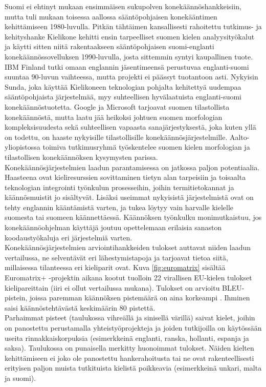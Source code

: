 \begin{multicols}{2}
Suomi ei ehtinyt mukaan ensimmäisen sukupolven konekäännöshankkeisiin,
mutta tuli mukaan toisessa aallossa sääntöpohjaisen konekääntimen
kehittämiseen 1980-luvulla. Pitkän tähtäimen kansallisesti rahoitettu
tutkimus- ja kehityshanke Kielikone kehitti ensin tarpeelliset suomen
kielen analyysityökalut ja käytti sitten niitä rakentaakseen
sääntöpohjaisen suomi-englanti konekäännössovelluksen 1990-luvulla,
josta sittemmin syntyi kaupallinen tuote. IBM Finland tutki omaan
englannin jäsentimeensä perustuvaa englanti-suomi suuntaa 90-luvun
vaihteessa, mutta projekti ei päässyt tuotantoon asti. Nykyisin Sunda,
joka käyttää Kielikoneen teknologian pohjalta kehitettyä uudempaa
sääntöpohjaista järjestelmää, myy suhteellisen hyvälaatuista
englanti-suomi konekäännöstuotetta. Google ja Microsoft tarjoavat
suomen tilastollista konekäännöstä, mutta laatu jää heikoksi johtuen
suomen morfologian kompleksisuudesta sekä suhteellisen vapaasta
sanajärjestyksestä, joka kuten yllä on todettu, on haaste nykyisille
tilastollisille konekäännösjärjestelmille. Aalto-yliopistossa toimiva
tutkimusryhmä työskentelee suomen kielen morfologian ja tilastollisen
konekäännöksen kysymysten parissa.\\
Konekäännösjärjestelmien laadun parantamisessa on jatkossa paljon
potentiaalia. Haasteena ovat kieliresurssien sovittaminen tietyn alan
tarpeisiin ja toisaalta teknologian integrointi työnkulun prosesseihin, joihin 
termitietokannat ja käännösmuistit jo sisältyvät. Lisäksi useimmat nykyisistä 
järjestelmistä ovat on tehty englannin kääntämistä varten, ja tukea
löytyy vain harvalle kielelle suomesta tai suomeen käännettäessä. Käännöksen 
työnkulku monimutkaistuu, jos konekäännöohjelman käyttäjä joutuu opettelemaan 
erilaisia sanaston koodaustyökaluja eri järjestelmiä varten.\\
Konekäännösjärjestelmien arviointihankkeiden tulokset auttavat niiden
laadun vertailussa, ne selventävät eri lähestymistapoja ja tarjoavat
tietoa siitä, millaisessa tilanteessa eri kieliparit ovat. Kuva
\ref{fig:euromatrix} sisältää Euromatrix+ -projektin aikana kootut
tuolloin 22 virallisen EU-kielen tulokset kielipareittain (iiri ei
ollut vertailussa mukana). Tulokset on arvioitu BLEU-pistein, joissa
paremman käännöksen pistemäärä on aina korkeampi \cite{BLEU}. Ihminen
saisi käännöstehtävästä keskimäärin 80 pistettä.\\
Parhaimmat pisteet (taulukossa vihreällä ja sinisellä värillä) saivat
kielet, joihin on panostettu perustamalla yhteistyöprojekteja ja
joiden tutkijoilla on käytössään useita rinnakkaiskorpuksia
(esimerkkeinä englanti, ranska, hollanti, espanja ja
saksa). Taulukossa on punaisella merkitty huonoimmat tulokset.  Näiden
kielten kehittämiseen ei joko ole panostettu hankerahoitusta tai ne
ovat rakenteellisesti erityisen paljon muista tutkituista kielistä
poikkeavia (esimerkkeinä unkari, malta ja suomi).


\end{multicols}
